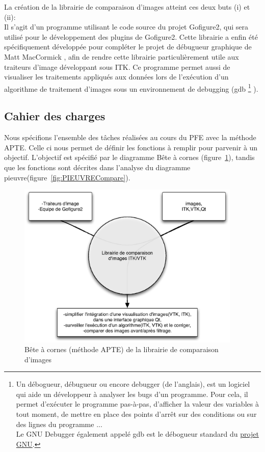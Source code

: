 La création de la librairie de comparaison d'images atteint ces deux buts (i) et (ii):\\ 
Il s'agit d'un programme utilisant le code source du projet Gofigure2, 
qui sera utilisé pour le développement des plugins de Gofigure2.
Cette librairie a enfin été spécifiquement développée pour compléter le projet de débugueur graphique de 
Matt MacCormick \cite{McCornic-VisualDebug}, afin de rendre cette librairie particulièrement utile
aux traiteurs d'image développant sous ITK.
Ce programme permet aussi de visualiser les traitements appliqués aux données
lors de l'exécution d'un algorithme de traitement d'images sous un environnement de debugging (gdb
\footnote{Un débogueur, débugueur ou encore debugger (de l'anglais), est un logiciel qui aide un développeur à analyser les bugs d'un programme. Pour cela, il permet d'exécuter le programme pas-à-pas, d'afficher la valeur des variables à tout moment, de mettre en place des points d'arrêt sur des conditions ou sur des lignes du programme ...\\
Le GNU Debugger également appelé gdb est le débogueur standard du \href{http://fr.wikipedia.org/wiki/Projet_GNU}{projet GNU}.} ).


\subsection{Cahier des charges}

Nous spécifions l'ensemble des tâches réalisées au cours du PFE avec la méthode APTE. Celle ci nous permet de définir les fonctions à remplir pour parvenir à un objectif. L'objectif est spécifié par le diagramme Bête à cornes (figure~\ref{fig:BACCompare}), tandis que les fonctions sont décrites dans l'analyse du diagramme pieuvre(figure~\ref{fig:PIEUVRECompare}).

\begin{figure}[h]
\begin{center}
\leavevmode
\includegraphics[width=0.95\textwidth]{pictures/CompareBAC}
\end{center}
\caption{Bête à cornes (méthode {APTE\textregistered}) de la librairie de comparaison d'images}
\label{fig:BACCompare}
\end{figure}

